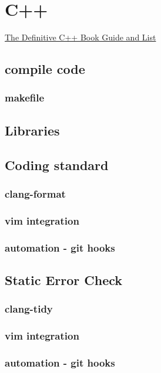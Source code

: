 \chapter{C++}
\href{https://stackoverflow.com/questions/388242/the-definitive-c-book-guide-and-list}{The Definitive C++ Book Guide and List}

\section{compile code} 

\subsection{makefile} 

\section{Libraries} 

\section{Coding standard} 
\subsection{clang-format}
\subsection{vim integration}
\subsection{automation - git hooks}


\section{Static Error Check} 
\subsection{clang-tidy}
\subsection{vim integration}
\subsection{automation - git hooks}

